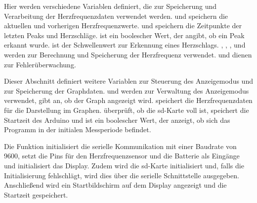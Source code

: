 Hier werden verschiedene Variablen definiert, die zur Speicherung und Verarbeitung der Herzfrequenzdaten verwendet werden.  und  speichern die aktuellen und vorherigen Herzfrequenzwerte.  und  speichern die Zeitpunkte der letzten Peaks und Herzschläge.  ist ein boolescher Wert, der angibt, ob ein Peak erkannt wurde.  ist der Schwellenwert zur Erkennung eines Herzschlags. , , ,  und  werden zur Berechnung und Speicherung der Herzfrequenz verwendet.  und  dienen zur Fehlerüberwachung.


\begin{code}[h]
\end{code}

\noindent Dieser Abschnitt definiert weitere Variablen zur Steuerung des Anzeigemodus und zur Speicherung der Graphdaten.  und  werden zur Verwaltung des Anzeigemodus verwendet,  gibt an, ob der Graph angezeigt wird.  speichert die Herzfrequenzdaten für die Darstellung im Graphen.  überprüft, ob die \ac{sd}-Karte voll ist,  speichert die Startzeit des Arduino und  ist ein boolescher Wert, der anzeigt, ob sich das Programm in der initialen Messperiode befindet.



\begin{code}[h]
\end{code}

Die Funktion   initialisiert die serielle Kommunikation mit einer Baudrate von 9600, setzt die Pins für den Herzfrequenzsensor und die Batterie als Eingänge und initialisiert das Display. Zudem wird die \ac{sd}-Karte initialisiert und,  falls die Initialisierung fehlschlägt, wird dies über die serielle Schnittstelle ausgegeben. Anschließend wird ein Startbildschirm auf dem Display angezeigt und die Startzeit gespeichert.

\begin{code}[h]
\end{code}


